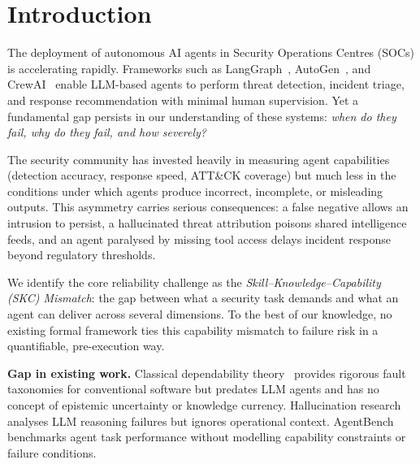 \section{Introduction}

The deployment of autonomous AI agents in Security Operations Centres
(SOCs) is accelerating rapidly. Frameworks such as LangGraph~\cite{langgraph2024},
AutoGen~\cite{wu2023autogen}, and CrewAI~\cite{crewai2024} enable LLM-based
agents to perform threat detection, incident triage, and response
recommendation with minimal human supervision. Yet a fundamental gap persists
in our understanding of these systems: \textit{when do they fail, why do they
fail, and how severely?}

The security community has invested heavily in measuring agent
capabilities (detection accuracy, response speed, ATT\&CK coverage) but
much less in the conditions under which agents produce incorrect,
incomplete, or misleading outputs. This asymmetry carries
serious consequences: a false negative allows an intrusion to persist, a
hallucinated threat attribution poisons shared intelligence feeds, and an
agent paralysed by missing tool access delays incident response beyond
regulatory thresholds.

We identify the core reliability challenge as the
\textit{Skill--Knowledge--Capability (SKC) Mismatch}: the gap between what
a security task demands and what an agent can deliver across several
dimensions. To the best of our knowledge, no existing formal framework ties this
capability mismatch to failure risk in a quantifiable, pre-execution way.

\textbf{Gap in existing work.}
Classical dependability theory~\cite{avizienis2004} provides rigorous fault
taxonomies for conventional software but predates LLM agents and has no
concept of epistemic uncertainty or knowledge currency. Hallucination
research~\cite{huang2023hallucination} analyses LLM reasoning failures but
ignores operational context. AgentBench~\cite{liu2023agentbench} benchmarks
agent task performance without modelling capability constraints or failure
conditions.

